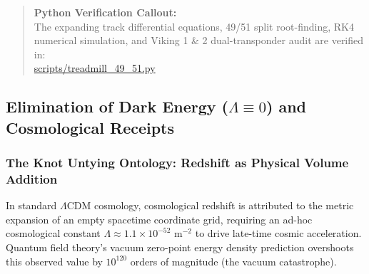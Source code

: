 \documentclass[11pt,a4paper]{article}
\begin{document}
\begin{quote}
\textbf{Python Verification Callout:}\\
The expanding track differential equations, 49/51 split root-finding, RK4 numerical simulation, and Viking 1 \& 2 dual-transponder audit are verified in:\\
\url{scripts/treadmill_49_51.py}
\end{quote}


\subsection{Elimination of Dark Energy ($\Lambda \equiv 0$) and Cosmological Receipts}
\label{subsec:dark_energy_elimination}

\subsubsection{The Knot Untying Ontology: Redshift as Physical Volume Addition}
\label{subsubsec:untying_ontology}

In standard $\Lambda\text{CDM}$ cosmology, cosmological redshift is attributed to the metric expansion of an empty spacetime coordinate grid, requiring an ad-hoc cosmological constant $\Lambda \approx 1.1 \times 10^{-52}\text{ m}^{-2}$ to drive late-time cosmic acceleration. Quantum field theory's vacuum zero-point energy density prediction overshoots this observed value by $10^{120}$ orders of magnitude (the vacuum catastrophe).
\end{document}
